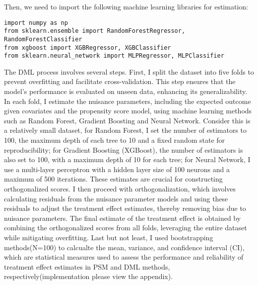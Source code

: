 \documentclass{article}
\begin{document}
\noindent Then, we need to import the following machine learning libraries for estimation:
\begin{verbatim}
import numpy as np
from sklearn.ensemble import RandomForestRegressor, RandomForestClassifier
from xgboost import XGBRegressor, XGBClassifier
from sklearn.neural_network import MLPRegressor, MLPClassifier
\end{verbatim}
The DML process involves several steps. First, I split the dataset into five folds to prevent overfitting and facilitate cross-validation. This step ensures that the model’s performance is evaluated on unseen data, enhancing its generalizability. In each fold, I estimate the nuisance parameters, including the expected outcome given covariates and the propensity score model, using machine learning methods such as Random Forest, Gradient Boosting and Neural Network. Consider this is a relatively small dataset, for Random Forest, I set the number of estimators to 100, the maximum depth of each tree to 10 and a fixed random state for reproducibility; for Gradient Boosting (XGBoost), the number of estimators is also set to 100, with a maximum depth of 10 for each tree; for Neural Network, I use a multi-layer perceptron with a hidden layer size of 100 neurons and a maximum of 500 iterations. These estimates are crucial for constructing orthogonalized scores. I then proceed with orthogonalization, which involves calculating residuals from the nuisance parameter models and using these residuals to adjust the treatment effect estimates, thereby removing bias due to nuisance parameters. The final estimate of the treatment effect is obtained by combining the orthogonalized scores from all folds, leveraging the entire dataset while mitigating overfitting. Last but not least, I used bootstrapping methods(N=100) to calcualte the mean, variance, and confidence interval (CI), which are statistical measures used to assess the performance and reliability of treatment effect estimates in PSM and DML methods, respectively(implementation please view the appendix).
\end{document}

